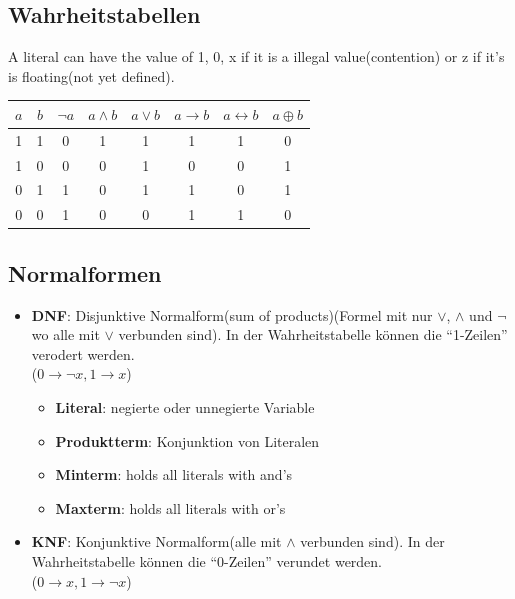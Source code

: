 \begin{multicols}{2}
	\subsection{Wahrheitstabellen}
	A literal can have the value of 1, 0, x if it is a illegal value(contention) or z if it's is floating(not yet defined).
		\renewcommand{\arraystretch}{1.2}
		\begin{tabular}{c|c||c|c|c|c|c|c}
			$a$ 	& $b$ & $\lnot a$ 	& $a\land b$& $a\lor b$	& $a\rightarrow b$ 	&$a \leftrightarrow b $& $a \oplus b $\\ \hline \hline
			1 		& 1	& 0			&  1			&  1			& 1						& 1										& 0			  \\ \hline
			1 		& 0	& 0			&  0			&  1			& 0						& 0										& 1			  \\ \hline 
			0 		& 1	& 1			&  0			&  1			& 1						& 0										& 1			  \\ \hline
			0 		& 0	& 1			&  0			&  0			& 1						& 1										& 0			  %
		\end{tabular}
	
	\subsection{Normalformen}
		\begin{itemize}
			\item \textbf{DNF}: Disjunktive Normalform(sum of products)(Formel mit nur $\vee$, $\wedge$ und $\neg$ wo alle mit $\vee$ verbunden sind). In der Wahrheitstabelle können die ``1-Zeilen'' verodert werden. \\ ($0 \to \lnot x, 1 \to x$)
			\begin{itemize}
				\item \textbf{Literal}: negierte oder unnegierte Variable
				\item \textbf{Produktterm}: Konjunktion von Literalen
				\item \textbf{Minterm}: holds all literals with and's
				\item \textbf{Maxterm}: holds all literals with or's
			\end{itemize}
			\item \textbf{KNF}: Konjunktive Normalform(alle mit $\wedge$ verbunden sind). In der Wahrheitstabelle können die ``0-Zeilen'' verundet werden. \\ ($0 \to x, 1 \to \lnot x$)
		\end{itemize}
		
	

\end{multicols}
